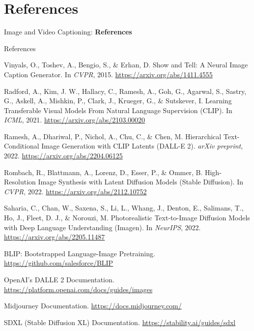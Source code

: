 \section{References}
\begin{frame}{}
    \LARGE Image and Video Captioning: \textbf{References}
\end{frame}

\begin{frame}[allowframebreaks]{References}
\begin{thebibliography}{99}

Vinyals, O., Toshev, A., Bengio, S., \& Erhan, D.
\newblock Show and Tell: A Neural Image Caption Generator.
\newblock In \emph{CVPR}, 2015.
\newblock \url{https://arxiv.org/abs/1411.4555}

Radford, A., Kim, J. W., Hallacy, C., Ramesh, A., Goh, G., Agarwal, S., Sastry, G., Askell, A., Mishkin, P., Clark, J., Krueger, G., \& Sutskever, I.
\newblock Learning Transferable Visual Models From Natural Language Supervision (CLIP).
\newblock In \emph{ICML}, 2021.
\newblock \url{https://arxiv.org/abs/2103.00020}

Ramesh, A., Dhariwal, P., Nichol, A., Chu, C., \& Chen, M.
\newblock Hierarchical Text-Conditional Image Generation with CLIP Latents (DALL-E 2).
\newblock \emph{arXiv preprint}, 2022.
\newblock \url{https://arxiv.org/abs/2204.06125}

Rombach, R., Blattmann, A., Lorenz, D., Esser, P., \& Ommer, B.
\newblock High-Resolution Image Synthesis with Latent Diffusion Models (Stable Diffusion).
\newblock In \emph{CVPR}, 2022.
\newblock \url{https://arxiv.org/abs/2112.10752}

Saharia, C., Chan, W., Saxena, S., Li, L., Whang, J., Denton, E., Salimans, T., Ho, J., Fleet, D. J., \& Norouzi, M.
\newblock Photorealistic Text-to-Image Diffusion Models with Deep Language Understanding (Imagen).
\newblock In \emph{NeurIPS}, 2022.
\newblock \url{https://arxiv.org/abs/2205.11487}

BLIP: Bootstrapped Language-Image Pretraining.
\newblock \url{https://github.com/salesforce/BLIP}

OpenAI's DALL\textbullet E 2 Documentation.
\newblock \url{https://platform.openai.com/docs/guides/images}

Midjourney Documentation.
\newblock \url{https://docs.midjourney.com/}

SDXL (Stable Diffusion XL) Documentation.
\newblock \url{https://stability.ai/guides/sdxl}

\end{thebibliography}
\end{frame}